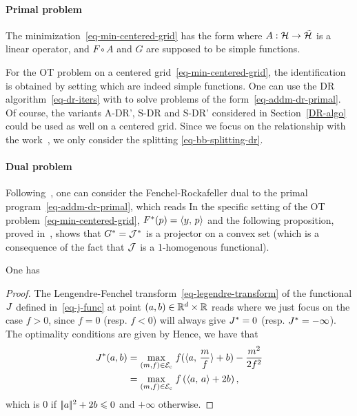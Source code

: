 \paragraph{Primal problem}

The minimization~\eqref{eq-min-centered-grid} has the form
where $A : \mathcal{H} \rightarrow \tilde{\mathcal{H}}$ is a linear operator, and $F \circ A$ and $G$ are supposed to be simple functions. 

For the OT problem on a centered grid~\eqref{eq-min-centered-grid}, the identification is obtained by setting 
which are indeed simple functions. One can use the DR algorithm~\eqref{eq-dr-iters} with 
to solve problems of the form~\eqref{eq-addm-dr-primal}. Of course, the variants A-DR', S-DR and S-DR' considered in Section~\ref{DR-algo} could be used as well on a centered grid.  Since we focus on the relationship with the work~\cite{Benamou2000}, we only consider the splitting \eqref{eq-bb-splitting-dr}.

\paragraph{Dual problem}

Following~\cite{Benamou2000}, one can consider the Fenchel-Rockafeller dual to the primal program~\eqref{eq-addm-dr-primal}, which reads
In the specific setting of the OT problem~\eqref{eq-min-centered-grid}, $F^*(p) = \langle y,\,p\rangle$ and the following proposition, proved in~\cite{Benamou2000}, shows that $G^* = \mathcal{J}^*$ is a projector on a convex set (which is a consequence of the fact that $\mathcal{J}$ is a 1-homogenous functional). 

\begin{prop}
	One has
\end{prop}
\begin{proof}
	The Lengendre-Fenchel transform~\eqref{eq-legendre-transform} of  the functional $J$ defined in~\eqref{eq-j-func} at point $(a,b)\in \mathbb{R}^d \times \mathbb{R}$ reads
where we just  focus on the case $f>0$, since $f=0$ (resp. $f<0$) will always give $J^*=0$ (resp. $J^*=-\infty$).
The optimality conditions  are given by
Hence, we have that
\begin{align*}
	J^*(a,b) &=\underset{(m,f) \in \mathcal{E}_{\text{c}}}{\max}\; f(\langle a,\,\frac{m}f\rangle+b) -\frac{m^2}{2f^2}\\
 &= \underset{(m,f) \in \mathcal{E}_{\text{c}}}{\max}\; f \left(\langle a,\,a\rangle+2b\right),
\end{align*}
which is $0$ if  $|\!| a |\!|^2 + 2b \leqslant 0$ and $+\infty$ otherwise.
\end{proof}

